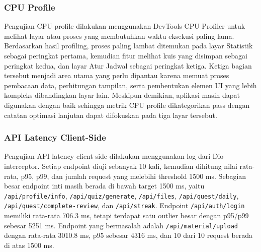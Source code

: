 \documentclass[11pt]{article}
\begin{document}
\subsubsection{CPU Profile}

Pengujian CPU profile dilakukan menggunakan DevTools CPU Profiler untuk melihat layar atau proses yang membutuhkan waktu eksekusi paling lama. Berdasarkan hasil profiling, proses paling lambat ditemukan pada layar Statistik sebagai peringkat pertama, kemudian fitur melihat kuis yang disimpan sebagai peringkat kedua, dan layar Atur Jadwal sebagai peringkat ketiga. Ketiga bagian tersebut menjadi area utama yang perlu dipantau karena memuat proses pembacaan data, perhitungan tampilan, serta pembentukan elemen UI yang lebih kompleks dibandingkan layar lain. Meskipun demikian, aplikasi masih dapat digunakan dengan baik sehingga metrik CPU profile dikategorikan pass dengan catatan optimasi lanjutan dapat difokuskan pada tiga layar tersebut.


\subsubsection{API Latency Client-Side}

Pengujian API latency client-side dilakukan menggunakan log dari Dio interceptor. Setiap endpoint diuji sebanyak 10 kali, kemudian dihitung nilai rata-rata, p95, p99, dan jumlah request yang melebihi threshold 1500 ms. Sebagian besar endpoint inti masih berada di bawah target 1500 ms, yaitu \texttt{/api/profile/info}, \texttt{/api/quiz/generate}, \texttt{/api/files}, \texttt{/api/quest/daily}, \texttt{/api/quest/complete-review}, dan \texttt{/api/streak}. Endpoint \texttt{/api/auth/login} memiliki rata-rata 706.3 ms, tetapi terdapat satu outlier besar dengan p95/p99 sebesar 5251 ms. Endpoint yang bermasalah adalah \texttt{/api/material/upload} dengan rata-rata 3010.8 ms, p95 sebesar 4316 ms, dan 10 dari 10 request berada di atas 1500 ms.
\end{document}
